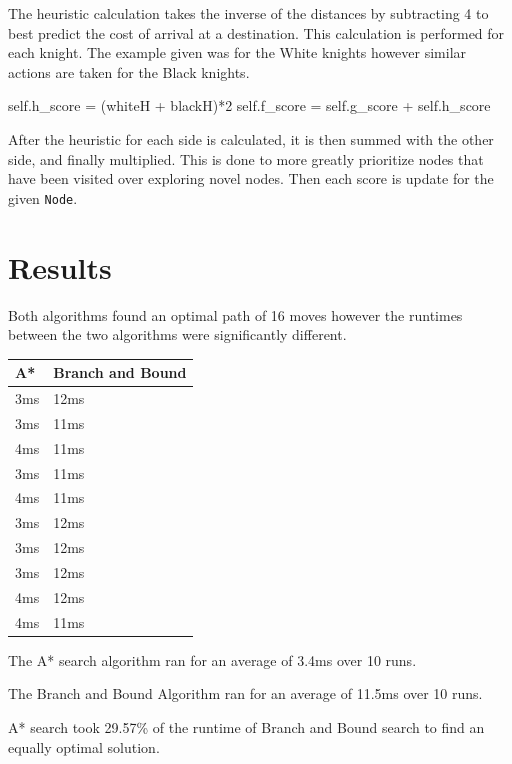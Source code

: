 \documentclass[12pt, letterpaper, final, onecolumn, titlepage] {article}
\begin{document}
\noindent The heuristic calculation takes the inverse of the distances by subtracting 4 to best predict the cost of arrival at a destination.
This calculation is performed for each knight.  The example given was for the White knights however similar actions are taken for the Black knights.
\vspace{0.4cm}
\begin{python}
self.h_score = (whiteH + blackH)*2
self.f_score = self.g_score + self.h_score
\end{python}
\noindent After the heuristic for each side is calculated, it is then summed with the other side, and finally multiplied.  This is done to more greatly prioritize nodes that have been visited over exploring novel nodes.  Then each score is update for the given \texttt{Node}.
\newpage

\section{Results}
Both algorithms found an optimal path of 16 moves however the runtimes between the two algorithms were significantly different.
\begin{center}
\begin{tabular}{|p{4cm}|p{4cm}|}
\hline
\textbf{A*} & \textbf{Branch and Bound} \\
\hline
3ms & 12ms \\
\hline
3ms & 11ms \\
\hline
4ms & 11ms \\
\hline
3ms & 11ms \\
\hline
4ms & 11ms \\
\hline
3ms & 12ms \\
\hline
3ms & 12ms \\
\hline
3ms & 12ms \\
\hline
4ms & 12ms \\
\hline
4ms & 11ms \\
\hline
\end{tabular}
\end{center}
\noindent The A* search algorithm ran for an average of 3.4ms over 10 runs.

\noindent The Branch and Bound Algorithm ran for an average of 11.5ms over 10 runs.

\noindent A* search took 29.57\% of the runtime of Branch and Bound search to find an equally optimal solution.
\end{document}
